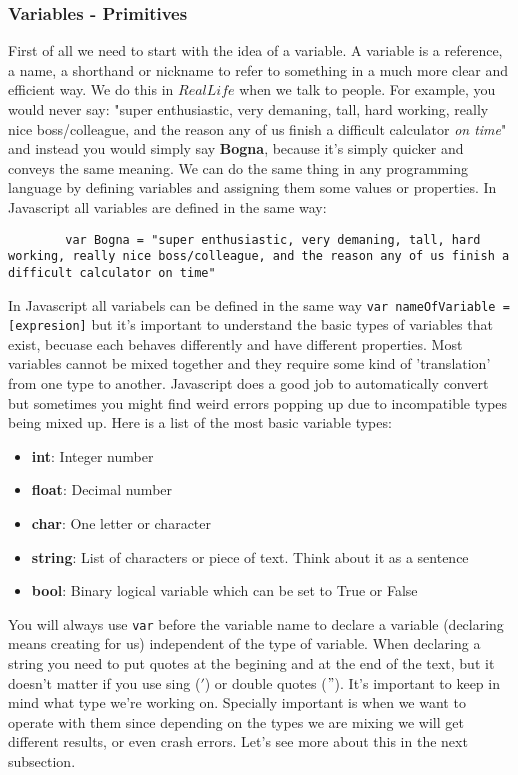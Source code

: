 \subsubsection{Variables - Primitives}
\label{subsub:primitives}
First of all we need to start with the idea of a variable. A variable is a reference, a name, a shorthand or nickname to refer to something in a much more clear and efficient way.  We do this in $Real Life$\texttrademark\xspace  when we talk to people. For example, you would never say: "super enthusiastic, very demaning, tall, hard working, really nice boss/colleague, and the reason any of us finish a difficult calculator \textit{on time}" and instead you would simply say \textbf{Bogna}, because it's simply quicker and conveys the same meaning.
We can do the same thing in any programming language by defining variables and assigning them some values or properties. In Javascript all variables are defined in the same way:
\begin{lstlisting}
        var Bogna = "super enthusiastic, very demaning, tall, hard working, really nice boss/colleague, and the reason any of us finish a difficult calculator on time"
\end{lstlisting}

In Javascript all variabels can be defined in the same way \texttt{var nameOfVariable = [expresion]} but it's important to understand the basic types of variables that exist, becuase each behaves differently and have different properties. Most variables cannot be mixed together and they require some kind of 'translation' from one type to another. Javascript does a good job to automatically convert but sometimes you might find weird errors popping up due to incompatible types being mixed up.
Here is a list of the most basic variable types:
\begin{itemize}
    \item \textbf{int}: Integer number
    \item \textbf{float}: Decimal number
    \item \textbf{char}: One letter or character
    \item \textbf{string}: List of characters or piece of text. Think about it as a sentence
    \item \textbf{bool}: Binary logical variable which can be set to True or False
\end{itemize}

You will always use \texttt{var} before the variable name to declare a variable (declaring means creating for us) independent of the type of variable. When declaring a string you need to put quotes at the begining and at the end of the text, but it doesn't matter if you use sing ($'$) or double quotes ($"$). It's important to keep in mind what type we're working on. Specially important is when we want to operate with them since depending on the types we are mixing we will get different results, or even crash errors. Let's see more about this in the next subsection.  

